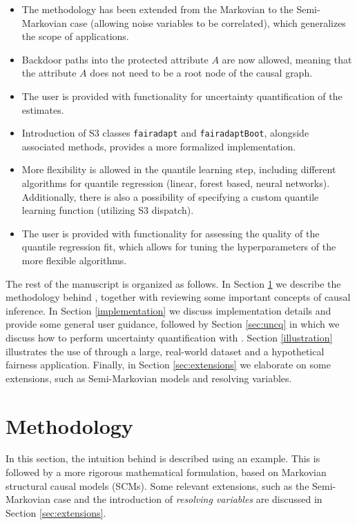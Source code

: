 \documentclass[
  nojss]{jss}
\providecommand{\tightlist}{%
  \setlength{\itemsep}{0pt}\setlength{\parskip}{0pt}}
\begin{document}
\begin{itemize}
\tightlist
\item
  The methodology has been extended from the Markovian to the
  Semi-Markovian case (allowing noise variables to be correlated), which
  generalizes the scope of applications.
\item
  Backdoor paths into the protected attribute \(A\) are now allowed,
  meaning that the attribute \(A\) does not need to be a root node of
  the causal graph.
\item
  The user is provided with functionality for uncertainty quantification
  of the estimates.
\item
  Introduction of S3 classes \texttt{fairadapt} and
  \texttt{fairadaptBoot}, alongside associated methods, provides a more
  formalized implementation.
\item
  More flexibility is allowed in the quantile learning step, including
  different algorithms for quantile regression (linear, forest based,
  neural networks). Additionally, there is also a possibility of
  specifying a custom quantile learning function (utilizing S3
  dispatch).
\item
  The user is provided with functionality for assessing the quality of
  the quantile regression fit, which allows for tuning the
  hyperparameters of the more flexible algorithms.
\end{itemize}

The rest of the manuscript is organized as follows. In Section
\ref{methodology} we describe the methodology behind ,
together with reviewing some important concepts of causal inference. In
Section \ref{implementation} we discuss implementation details and
provide some general user guidance, followed by Section \ref{sec:uncq}
in which we discuss how to perform uncertainty quantification with
. Section \ref{illustration} illustrates the use of
 through a large, real-world dataset and a hypothetical
fairness application. Finally, in Section \ref{sec:extensions} we
elaborate on some extensions, such as Semi-Markovian models and
resolving variables.

\hypertarget{methodology}{%
\section{Methodology}\label{methodology}}

In this section, the intuition behind  is described using
an example. This is followed by a more rigorous mathematical
formulation, based on Markovian structural causal models (SCMs). Some
relevant extensions, such as the Semi-Markovian case and the
introduction of \emph{resolving variables} are discussed in Section
\ref{sec:extensions}.
\end{document}
